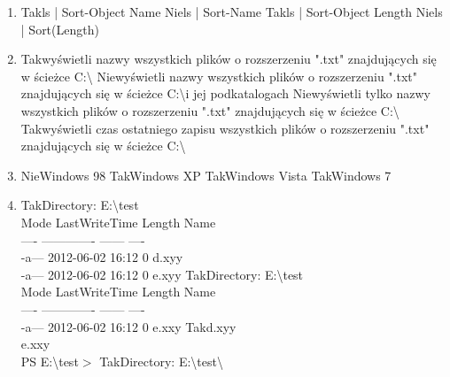 \begin{enumerate}
		\newpage
		\item {}%
		{Tak}{ls | Sort-Object Name}%
		{Nie}{ls | Sort-Name}%
		{Tak}{ls | Sort-Object Length}%
		{Nie}{ls | Sort(Length)}
		\item {}%
		{Tak}{wyświetli nazwy wszystkich plików o rozszerzeniu ".txt" znajdujących się w ścieżce C:\textbackslash}%
		{Nie}{wyświetli nazwy wszystkich plików o rozszerzeniu ".txt" znajdujących się w ścieżce C:\textbackslash i jej podkatalogach}%
		{Nie}{wyświetli tylko nazwy wszystkich plików o rozszerzeniu ".txt" znajdujących się w ścieżce C:\textbackslash}%
		{Tak}{wyświetli czas ostatniego zapisu wszystkich plików o rozszerzeniu ".txt" znajdujących się w ścieżce C:\textbackslash}
		\item {}%
		{Nie}{Windows 98}%
		{Tak}{Windows XP}%
		{Tak}{Windows Vista}%
		{Tak}{Windows 7}
		\item {}%
		{Tak}{Directory: E:\textbackslash test\\
			Mode  LastWriteTime Length Name\\
			----  ------------- ------ ----\\
			-a--- 2012-06-02    16:12  0 d.xyy\\
			-a--- 2012-06-02    16:12  0 e.xyy}%
		{Tak}{Directory: E:\textbackslash test\\
			Mode  LastWriteTime Length Name\\
			----  ------------- ------ ----\\
			-a--- 2012-06-02    16:12  0 e.xxy}%
		{Tak}{d.xyy\\
			e.xxy\\
			PS E:\textbackslash test$ > $}%
		{Tak}{Directory: E:\textbackslash test\textbackslash }
		

\end{enumerate}
